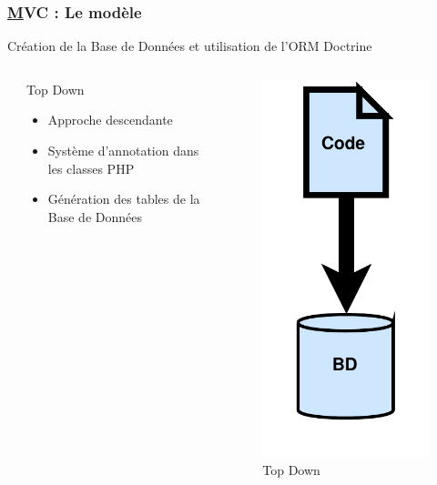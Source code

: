 \begin{frame}
	\frametitle{\underline{M}VC : Le modèle}
	\begin{block}{Création de la Base de Données et utilisation de l'ORM Doctrine}	
		\begin{columns}
			\begin{column}{0.9cm}
			\end{column}
			\begin{column}{6cm}
				\begin{Large} Top Down\end{Large}
				\begin{itemize}
					\item Approche descendante
					\item Système d'annotation dans les classes PHP
					\item Génération des tables de la Base de Données
				\end{itemize}
		\end{column}
		
		\begin{column}{4cm}
			\begin{figure}[!h]
				\begin{center}
					\includegraphics[scale=0.275]{images/topDown}
					\caption{Top Down}
				\end{center}
			\end{figure}
		\end{column}
	

\end{columns}
\end{block}
\end{frame}
